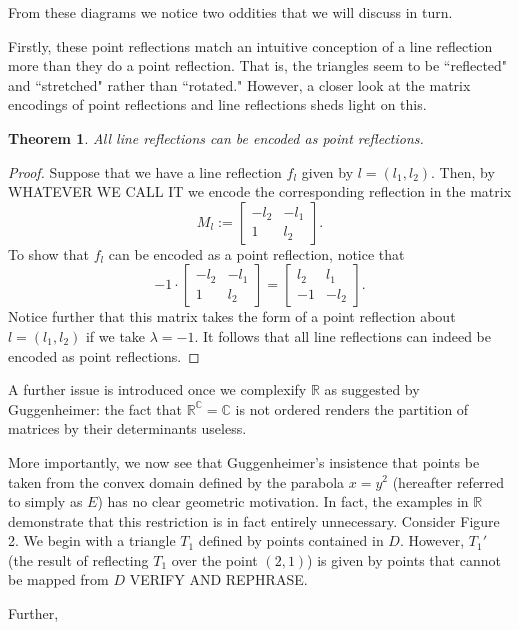 \documentclass[12pt]{article}
\newcommand{\R}{\mathbb{R}}
\newcommand{\C}{\mathbb{C}}
\newcommand{\lftmat}[4]{\begin{bmatrix} {#1} & {#2} \\ {#3} & {#4} \end{bmatrix}}
\newcommand{\linenoendmat}[2]{\begin{bmatrix} -{#2} & -{#1} \\ 1 & {#2} \end{bmatrix}}
\newcommand{\stanlinenoendmat}{\linenoendmat{l_1}{l_2}}
\theoremstyle{plain}
\newtheorem{theorem}{Theorem}[section]
\theoremstyle{definition}
\begin{document}
From these diagrams we notice two oddities that we will discuss in turn. 

Firstly, these point reflections match an intuitive conception of a line reflection more than they do a point reflection. That is, the triangles seem to be ``reflected" and ``stretched" rather than ``rotated." However, a closer look at the matrix encodings of point reflections and line reflections sheds light on this. 

\begin{theorem}
All line reflections can be encoded as point reflections. 
\end{theorem}

\begin{proof}
Suppose that we have a line reflection $f_l$ given by $l = (l_1, l_2)$. Then, by WHATEVER WE CALL IT we encode the corresponding reflection in the matrix 
\[ M_l := \stanlinenoendmat. \]
To show that $f_l$ can be encoded as a point reflection, notice that 
\[ -1 \cdot \stanlinenoendmat = \lftmat{l_2}{l_1}{-1}{-l_2}.\]
Notice further that this matrix takes the form of a point reflection about $l = (l_1, l_2)$ if we take $\lambda = -1$. It follows that all line reflections can indeed be encoded as point reflections.
\end{proof}

A further issue is introduced once we complexify $\R$ as suggested by Guggenheimer: the fact that $\R^{\C} = \C$ is not ordered renders the partition of matrices by their determinants useless. 


More importantly, we now see that Guggenheimer's insistence that points be taken from the convex domain defined by the parabola $x = y^2$ (hereafter referred to simply as $E$) has no clear geometric motivation. In fact, the examples in $\R$ demonstrate that this restriction is in fact entirely unnecessary. Consider Figure 2. We begin with a triangle $T_1$ defined by points contained in $D$. However, $T_1'$ (the result of reflecting $T_1$ over the point $(2, 1)$) is given by points that cannot be mapped from $D$ VERIFY AND REPHRASE. 

Further, 
\end{document}
